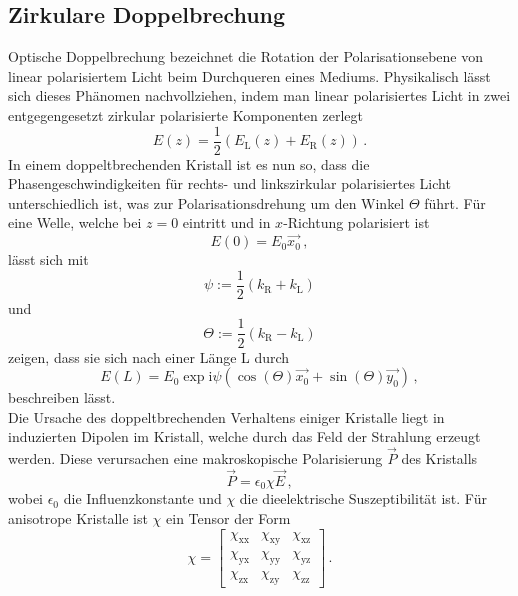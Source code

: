 \subsection{Zirkulare Doppelbrechung}
Optische Doppelbrechung bezeichnet die Rotation der Polarisationsebene von linear polarisiertem Licht beim Durchqueren eines Mediums. Physikalisch lässt sich dieses Phänomen nachvollziehen, indem man linear polarisiertes Licht in zwei entgegengesetzt zirkular polarisierte Komponenten zerlegt
\begin{equation}
E(z)=\frac{1}{2}(E_\text{L}(z)+E_\text{R}(z))\,.
\end{equation}
In einem doppeltbrechenden Kristall ist es nun so, dass die Phasengeschwindigkeiten für rechts- und linkszirkular polarisiertes Licht unterschiedlich ist, was zur Polarisationsdrehung um den Winkel $\Theta$ führt. Für eine Welle, welche bei $z=0$ eintritt und in $x$-Richtung polarisiert ist
\begin{equation}
  E(0)=E_0\vec{x_0}\,,
\end{equation}
lässt sich mit
\begin{equation}
  \psi:=\frac{1}{2}\left(k_\text{R}+k_\text{L}\right)
\end{equation}
und
\begin{equation}
\Theta:=\frac{1}{2}\left(k_\text{R}-k_\text{L}\right)
\label{eq:theta}
\end{equation}
zeigen, dass sie sich nach einer Länge L durch
\begin{equation}
E(L)=E_0 \exp{\text{i}\psi}\left(\cos(\Theta)\vec{x_0}+\sin(\Theta)\vec{y_0}\right)\,,
\end{equation}
beschreiben lässt.\\
Die Ursache des doppeltbrechenden Verhaltens einiger Kristalle liegt in induzierten Dipolen im Kristall, welche durch das Feld der Strahlung erzeugt werden. Diese verursachen eine makroskopische Polarisierung $\vec{P}$ des Kristalls
\begin{equation}
\vec{P}=\epsilon_0\chi\vec{E}\,,
\end{equation}
wobei $\epsilon_0$ die Influenzkonstante und $\chi$ die dieelektrische Suszeptibilität ist.
Für anisotrope Kristalle ist $\chi$ ein Tensor der Form
\begin{equation}
  \chi=
  \left[ {\begin{array}{ccc}
   \chi_\text{xx} & \chi_\text{xy} & \chi_\text{xz}\\
   \chi_\text{yx} & \chi_\text{yy} & \chi_\text{yz}\\
   \chi_\text{zx} & \chi_\text{zy} &\chi_\text{zz}
  \end{array} } \right]\,.
\end{equation}

